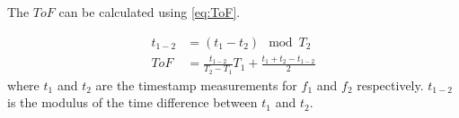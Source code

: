 The $ToF$ can be calculated using \cref{eq:ToF}.

\begin{align}
	t_{1-2} &= (t_1-t_2)\mod T_2\\
	ToF &= \frac{t_{1-2}}{T_2-T_1}T_1+\frac{t_1+t_2-t_{1-2}}{2}\label{eq:ToF}
\end{align}
where $t_1$ and $t_2$ are the timestamp measurements for $f_1$ and $f_2$ respectively. $t_{1-2}$ is the modulus of the time difference between $t_1$ and $t_2$.
